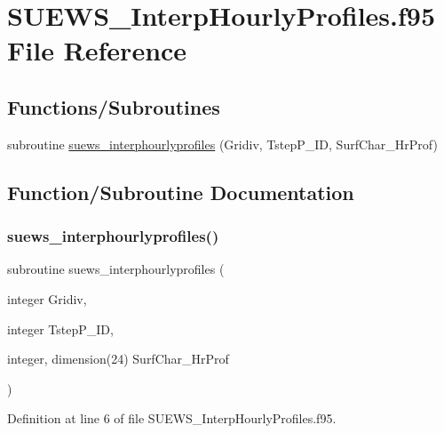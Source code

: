 \hypertarget{_s_u_e_w_s___interp_hourly_profiles_8f95}{}\section{S\+U\+E\+W\+S\+\_\+\+Interp\+Hourly\+Profiles.\+f95 File Reference}
\label{_s_u_e_w_s___interp_hourly_profiles_8f95}
\subsection*{Functions/\+Subroutines}
\begin{DoxyCompactItemize}
\item 
subroutine \hyperlink{_s_u_e_w_s___interp_hourly_profiles_8f95_ab1f2af7660f9d6b3ee611e846b78547a}{suews\+\_\+interphourlyprofiles} (Gridiv, Tstep\+P\+\_\+\+ID, Surf\+Char\+\_\+\+Hr\+Prof)
\end{DoxyCompactItemize}


\subsection{Function/\+Subroutine Documentation}
\mbox{\label{_s_u_e_w_s___interp_hourly_profiles_8f95_ab1f2af7660f9d6b3ee611e846b78547a}} 
\subsubsection{\texorpdfstring{suews\+\_\+interphourlyprofiles()}{suews\_interphourlyprofiles()}}
{\footnotesize\ttfamily subroutine suews\+\_\+interphourlyprofiles (\begin{DoxyParamCaption}\item[{integer}]{Gridiv,  }\item[{integer}]{Tstep\+P\+\_\+\+ID,  }\item[{integer, dimension(24)}]{Surf\+Char\+\_\+\+Hr\+Prof }\end{DoxyParamCaption})}



Definition at line 6 of file S\+U\+E\+W\+S\+\_\+\+Interp\+Hourly\+Profiles.\+f95.

